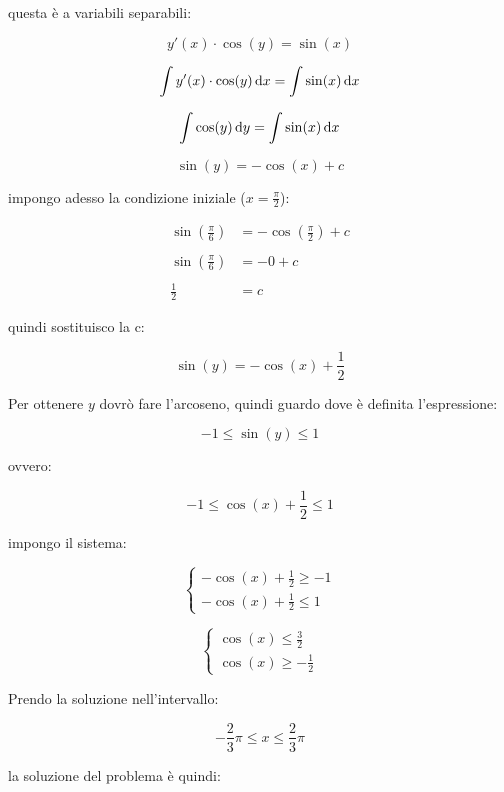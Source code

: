 questa è a variabili separabili:

\[
    y'(x)\cdot\cos(y) = \sin(x)
\]

\[
    \int y'(x)\cdot\cos(y) \mathop{}\!\mathrm{d} x = \int \sin(x) \mathop{}\!\mathrm{d} x
\]

\[
    \int \cos(y) \mathop{}\!\mathrm{d} y = \int \sin(x) \mathop{}\!\mathrm{d} x
\]

\[
    \sin(y) = -\cos(x) +c
\]

impongo adesso la condizione iniziale (\(x=\frac{\pi}{2}\)):

\begin{align*}
    \sin\left(\frac{\pi}{6}\right) & = -\cos\left(\frac{\pi}{2}\right) + c \\ \\
    \sin\left(\frac{\pi}{6}\right) & = -0 +c                               \\ \\
    \frac{1}{2}                    & = c
\end{align*}

quindi sostituisco la c:

\[
    \sin\left(y\right) = - \cos(x) + \frac{1}{2}
\]

Per ottenere \(y\) dovrò fare l'arcoseno, quindi guardo dove è definita l'espressione:

\[
    -1 \le \sin\left(y\right) \le 1
\]

ovvero:

\[
    -1 \le \cos(x) + \frac{1}{2} \le 1
\]

impongo il sistema:

\begin{equation*}
    \begin{cases*}
        -\cos(x) +\frac{1}{2}\ge -1 \\
        -\cos(x) + \frac{1}{2} \le 1
    \end{cases*}
\end{equation*}

\begin{equation*}
    \begin{cases*}
        \cos(x) \le \frac{3}{2} \\
        \cos(x) \ge -\frac{1}{2}
    \end{cases*}
\end{equation*}

Prendo la soluzione nell'intervallo:

\[
    -\frac{2}{3}\pi \le  x \le \frac{2}{3}\pi
\]

la soluzione del problema è quindi:

